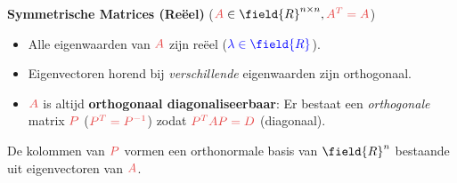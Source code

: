 \documentclass[12pt]{article}
\newcommand{\scalar}[1]{\textcolor{scalarBrightBlue}{#1}}
\newcommand{\mat}[1]{\textcolor{matrixSoftRed}{#1}}
\begin{document}
\vspace{1.5em} %
{\centering
\textcolor{headerBrown}{\large\textbf{Symmetrische Matrices (Reëel)}} ($\mat{A} \in \field{R}^{n \times n}, \mat{A^T = A}$)
\par
}%
\begin{itemize}
    \item Alle eigenwaarden van $\mat{A}$ zijn reëel ($\scalar{\lambda \in \field{R}}$).
    \item Eigenvectoren horend bij \textit{verschillende} eigenwaarden zijn orthogonaal.
    \item $\mat{A}$ is altijd \textbf{orthogonaal diagonaliseerbaar}: Er bestaat een \textit{orthogonale} matrix $\mat{P}$ ($\mat{P^T = P^{-1}}$) zodat $\mat{P^T A P = D}$ (diagonaal).
\end{itemize}
De kolommen van $\mat{P}$ vormen een orthonormale basis van $\field{R}^n$ bestaande uit eigenvectoren van $\mat{A}$.
\end{document}
